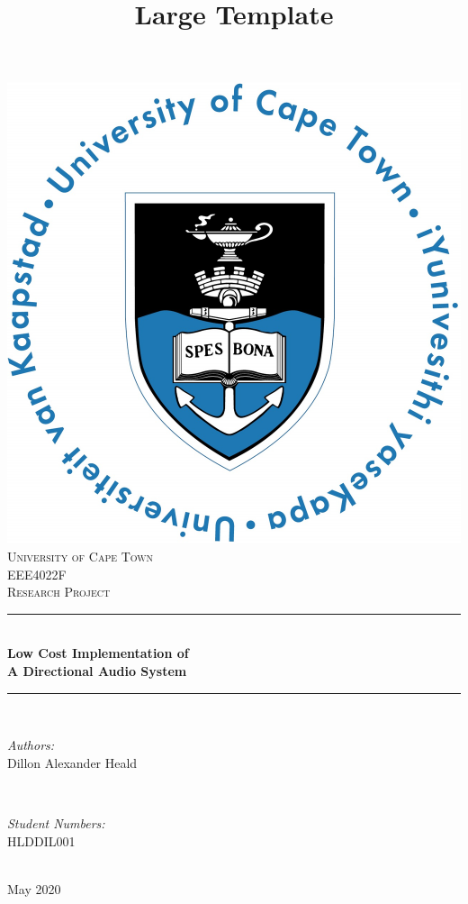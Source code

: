 \title{Large Template}


\begin{titlepage}
	\centering
	\vspace*{0.5 cm}
	\includegraphics[scale = 0.5]{Figures/UCT.jpg}\\[1 cm]	%
	\textsc{\LARGE University of Cape Town}\\[2.0 cm]	%
	\textsc{\Large EEE4022F}\\[0.5 cm]				%
	\textsc{\large Research Project}\\[0.5 cm]				%
	\rule{\linewidth}{0.2 mm} \\[0.4 cm]
	{ \huge \bfseries Low Cost Implementation of \\A Directional Audio System}\\
	\rule{\linewidth}{0.2 mm} \\[1.5 cm]
	
	\begin{minipage}{0.4\textwidth}
		\begin{flushleft} \large
			\emph{Authors:}\\
			Dillon Alexander Heald\\
		\end{flushleft}
	\end{minipage}~
	\begin{minipage}{0.4\textwidth}
		\begin{flushright} \large
			\emph{Student Numbers:} \\
			HLDDIL001
		\end{flushright}
	\end{minipage}\\[2 cm]
	
	{\large May 2020\\[2 cm]
	
	\vfill
	}
\end{titlepage}